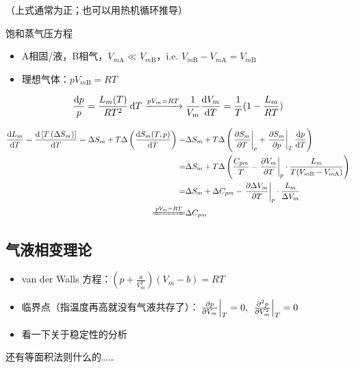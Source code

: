 （上式通常为正；也可以用热机循环推导）

饱和蒸气压方程
\begin{itemize}
    \item A相固/液，B相气，$V_{m\text{A}} \ll V_{m\text{B}}$，i.e. $V_{m\text{B}} - V_{m\text{A}} = V_{m\text{B}}$
    \item 理想气体：$p V_{m\text{B}} = R T$
\end{itemize}

\[
    \frac{\dd{p}}{p} = \frac{L_m(T)}{R T^2} \dd{T} \xrightarrow{p V_m = R T} \frac{1}{V_m} \dv{V_m}{T} = \frac{1}{T} (1 - \frac{L_m}{R T})
\]

\begin{align*}
    \dv{L_m}{T} = \dv{\left[T \left(\Delta S_m\right)\right]}{T} = \Delta S_m + T \Delta \left(\dv{S_m(T, p)}{T}\right) = & \Delta S_m + T \Delta \left(\left.\pdv{S_m}{T}\right|_p + \left.\pdv{S_m}{p}\right|_T \dv{p}{T}\right)                                  \\
    =                                                                                                                     & \Delta S_m + T \Delta \left(\frac{C_{pm}}{T} - \left.\pdv{V_m}{T}\right|_p \cdot \frac{L_m}{T (V_{m \text{B}} - V_{m \text{A}})}\right) \\
    =                                                                                                                     & \Delta S_m + \Delta C_{pm} - \left.\pdv{\Delta V_m}{T}\right|_p \cdot \frac{L_m}{\Delta V_m}                                            \\
    \xlongequal{p V_m = R T}                                                                                              & \Delta C_{pm}
\end{align*}

\subsection{气液相变理论}

\begin{itemize}
    \item van der Walls 方程：$\left(p + \frac{a}{V_m^2}\right) \left(V_m - b\right) = R T$
    \item 临界点（指温度再高就没有气液共存了）：$\left.\pdv{p}{V_m}\right|_T = 0,\ \left.\pdv[2]{p}{V_m}\right|_T = 0$
    \item 看一下关于稳定性的分析
\end{itemize}

还有等面积法则什么的……